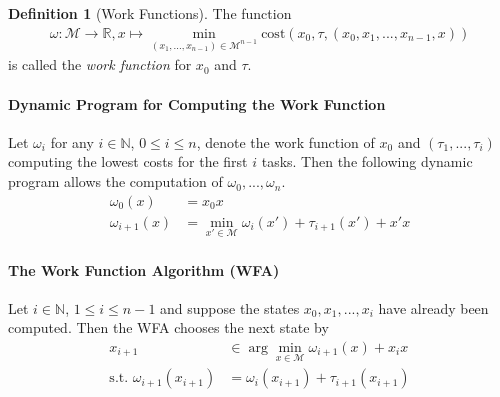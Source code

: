 \documentclass[10pt]{amsart}
\theoremstyle{definition}
\newtheorem{definition}{Definition}
\theoremstyle{remark}
\begin{document}
    \begin{definition}[Work Functions]
        The function
        \begin{align}
            \omega\colon \mathcal{M} \to \mathbb{R}, x \mapsto \textstyle\min_{(x_1, ..., x_{n-1}) \in \mathcal{M}^{n-1}} \text{cost}(x_0, \tau, (x_0, x_1, ..., x_{n-1}, x))
        \end{align}
        is called the \emph{work function} for \(x_0\) and \(\tau\).
    \end{definition}

    \newpage

    \begin{mdframed}
        \paragraph*{\textbf{Dynamic Program for Computing the Work Function}}
        Let \(\omega_i\) for any \(i \in \mathbb{N}\), \(0 \leq i \leq n\), denote the work function of \(x_0\) and \((\tau_1, ..., \tau_i)\) computing the lowest costs for the first \(i\) tasks. Then the following dynamic program allows the computation of \(\omega_0, ..., \omega_n\).
        \begin{align}
            \omega_0(x) &= x_0x\\
            \omega_{i+1}(x) &= \min_{x' \in \mathcal{M}} \omega_i(x') + \tau_{i+1}(x') + x'x \label{work_function_comp_dyn_prog_second_stmt}
        \end{align}
    \end{mdframed}

    \phantom{}

    \begin{mdframed}
        \paragraph*{\textbf{The Work Function Algorithm (WFA)}} Let \(i \in \mathbb{N}\), \(1 \leq i \leq n-1\) and suppose the states \(x_0, x_1, ..., x_i\) have already been computed. Then the WFA chooses the next state by
        \begin{align*}
            x_{i+1} &\in \arg\min_{x \in \mathcal{M}} \omega_{i+1}(x)+x_ix \tag{\(\dagger\)} \label{wfa_first_condition}\\
            \text{s.t. } \omega_{i+1}(x_{i+1}) &= \omega_i(x_{i+1})+\tau_{i+1}(x_{i+1}) \tag{\Ankh} \label{wfa_second_condition}
        \end{align*}
    \end{mdframed}
\end{document}
